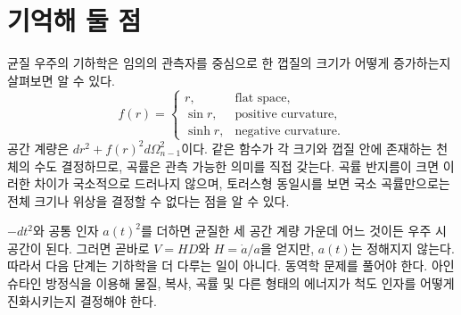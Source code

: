 \begin{classroomqa}
\end{classroomqa}

\section{기억해 둘 점}

균질 우주의 기하학은 임의의 관측자를 중심으로 한 껍질의 크기가 어떻게 증가하는지 살펴보면 알 수 있다.
\begin{equation}
f(r)=
\begin{cases}
r, & \text{flat space},\\
\sin r, & \text{positive curvature},\\
\sinh r, & \text{negative curvature}.
\end{cases}
\end{equation}
공간 계량은 \(dr^2+f(r)^2d\Omega_{n-1}^2\)이다. 같은 함수가 각 크기와 껍질 안에 존재하는 천체의 수도 결정하므로, 곡률은 관측 가능한 의미를 직접 갖는다. 곡률 반지름이 크면 이러한 차이가 국소적으로 드러나지 않으며, 토러스형 동일시를 보면 국소 곡률만으로는 전체 크기나 위상을 결정할 수 없다는 점을 알 수 있다.

\(-dt^2\)와 공통 인자 \(a(t)^2\)를 더하면 균질한 세 공간 계량 가운데 어느 것이든 우주 시공간이 된다. 그러면 곧바로 \(V=HD\)와 \(H=\dot a/a\)을 얻지만, \(a(t)\)는 정해지지 않는다. 따라서 다음 단계는 기하학을 더 다루는 일이 아니다. 동역학 문제를 풀어야 한다. 아인슈타인 방정식을 이용해 물질, 복사, 곡률 및 다른 형태의 에너지가 척도 인자를 어떻게 진화시키는지 결정해야 한다.
